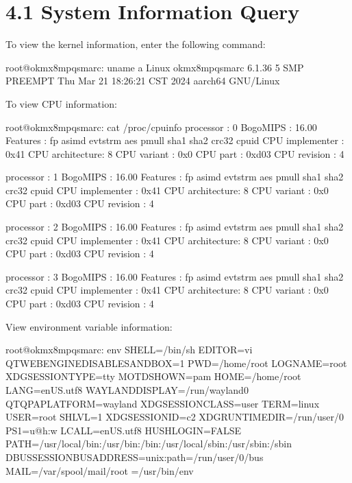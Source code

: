 \documentclass[letterpaper,10pt,openany,english]{sphinxmanual}
\begin{document}
\section{4.1 System Information Query}
\label{\detokenize{linux-manual:system-information-query}}
\sphinxAtStartPar
To view the kernel information, enter the following command:

\begin{sphinxVerbatim}[commandchars=\\\{\}]
root@ok\PYGZhy{}mx8mpq\PYGZhy{}smarc:\PYGZti{}\PYGZsh{} uname \PYGZhy{}a
Linux ok\PYGZhy{}mx8mpq\PYGZhy{}smarc 6.1.36 \PYGZsh{}5 SMP PREEMPT Thu Mar 21 18:26:21 CST 2024 aarch64 GNU/Linux
\end{sphinxVerbatim}

\sphinxAtStartPar
To view CPU information:

\begin{sphinxVerbatim}[commandchars=\\\{\}]
root@ok\PYGZhy{}mx8mpq\PYGZhy{}smarc:\PYGZti{}\PYGZsh{} cat /proc/cpuinfo
processor       : 0
BogoMIPS        : 16.00
Features        : fp asimd evtstrm aes pmull sha1 sha2 crc32 cpuid
CPU implementer : 0x41
CPU architecture: 8
CPU variant     : 0x0
CPU part        : 0xd03
CPU revision    : 4

processor       : 1
BogoMIPS        : 16.00
Features        : fp asimd evtstrm aes pmull sha1 sha2 crc32 cpuid
CPU implementer : 0x41
CPU architecture: 8
CPU variant     : 0x0
CPU part        : 0xd03
CPU revision    : 4

processor       : 2
BogoMIPS        : 16.00
Features        : fp asimd evtstrm aes pmull sha1 sha2 crc32 cpuid
CPU implementer : 0x41
CPU architecture: 8
CPU variant     : 0x0
CPU part        : 0xd03
CPU revision    : 4

processor       : 3
BogoMIPS        : 16.00
Features        : fp asimd evtstrm aes pmull sha1 sha2 crc32 cpuid
CPU implementer : 0x41
CPU architecture: 8
CPU variant     : 0x0
CPU part        : 0xd03
CPU revision    : 4
\end{sphinxVerbatim}

\sphinxAtStartPar
View environment variable information:

\begin{sphinxVerbatim}[commandchars=\\\{\}]
root@ok\PYGZhy{}mx8mpq\PYGZhy{}smarc:\PYGZti{}\PYGZsh{} env
SHELL=/bin/sh
EDITOR=vi
QTWEBENGINE\PYGZus{}DISABLE\PYGZus{}SANDBOX=1
PWD=/home/root
LOGNAME=root
XDG\PYGZus{}SESSION\PYGZus{}TYPE=tty
MOTD\PYGZus{}SHOWN=pam
HOME=/home/root
LANG=en\PYGZus{}US.utf8
WAYLAND\PYGZus{}DISPLAY=/run/wayland\PYGZhy{}0
QT\PYGZus{}QPA\PYGZus{}PLATFORM=wayland
XDG\PYGZus{}SESSION\PYGZus{}CLASS=user
TERM=linux
USER=root
SHLVL=1
XDG\PYGZus{}SESSION\PYGZus{}ID=c2
XDG\PYGZus{}RUNTIME\PYGZus{}DIR=/run/user/0
PS1=\PYGZbs{}u@\PYGZbs{}h:\PYGZbs{}w\PYGZbs{}\PYGZdl{} 
LC\PYGZus{}ALL=en\PYGZus{}US.utf8
HUSHLOGIN=FALSE
PATH=/usr/local/bin:/usr/bin:/bin:/usr/local/sbin:/usr/sbin:/sbin
DBUS\PYGZus{}SESSION\PYGZus{}BUS\PYGZus{}ADDRESS=unix:path=/run/user/0/bus
MAIL=/var/spool/mail/root
\PYGZus{}=/usr/bin/env
\end{sphinxVerbatim}
\end{document}
